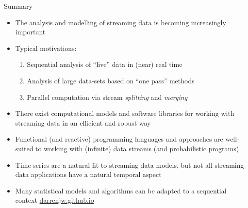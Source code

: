 \begin{frame}{Summary}
\protect\hypertarget{summary}{}

\begin{itemize}
\tightlist
\item
  The analysis and modelling of streaming data is becoming increasingly
  important
\item
  Typical motivations:

  \begin{enumerate}
  \tightlist
  \item
    Sequential analysis of ``live'' data in (near) real time
  \item
    Analysis of large data-sets based on ``one pass'' methods
  \item
    Parallel computation via stream \emph{splitting} and \emph{merging}
  \end{enumerate}
\item
  There exist computational models and software libraries for working
  with streaming data in an efficient and robust way
\item
  Functional (and reactive) programming languages and approaches are
  well-suited to working with (infinite) data streams (and probabilistic
  programs)
\item
  Time series are a natural fit to streaming data models, but not all
  streaming data applications have a natural temporal aspect
\item
  Many statistical models and algorithms can be adapted to a sequential
  context \hfill \alert{\url{darrenjw.github.io}}
\end{itemize}

\end{frame}
